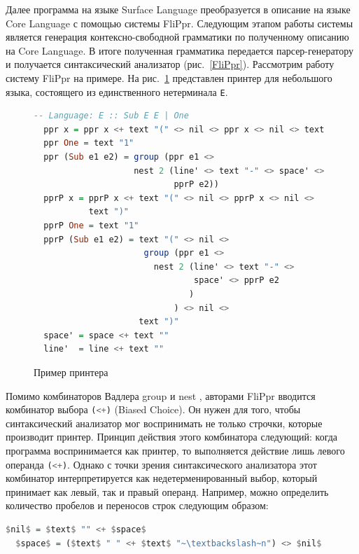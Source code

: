 Далее программа на языке Surface Language преобразуется в описание на языке Core Language 
с помощью системы FliPpr. Следующим этапом работы системы является генерация контексно-свободной 
грамматики по полученному описанию на Core Language. В итоге полученная грамматика передается 
парсер-генератору и получается синтаксический анализатор (рис.~\ref{FliPpr}).
Рассмотрим работу систему FliPpr на примере. На рис.~\ref{printer_example} представлен принтер 
для небольшого языка, состоящего из единственного нетерминала
\texttt{E}.
\begin{figure}[h]
\centering
\begin{lstlisting}[language=Haskell]
  -- Language: E :: Sub E E | One
  ppr x = ppr x <+ text "(" <> nil <> ppr x <> nil <> text ")"
  ppr One = text "1"
  ppr (Sub e1 e2) = group (ppr e1 <> 
                    nest 2 (line' <> text "-" <> space' <> 
                            pprP e2))
  pprP x = pprP x <+ text "(" <> nil <> pprP x <> nil <> 
           text ")"
  pprP One = text "1"
  pprP (Sub e1 e2) = text "(" <> nil <> 
                      group (ppr e1 <> 
                        nest 2 (line' <> text "-" <> 
                                space' <> pprP e2
                               )
                            ) <> nil <> 
                     text ")"
  space' = space <+ text ""
  line'  = line <+ text "" 
\end{lstlisting}
\caption{Пример принтера}
\label{printer_example}
\end{figure}

Помимо комбинаторов Вадлера
group и nest \cite{WadlerPrinter}, авторами FliPpr
вводится комбинатор выбора 
\lstinline[language=Haskell]{(<+)} (Biased Choice). Он нужен для того, чтобы синтаксический 
анализатор мог воспринимать не только строчки, которые производит принтер. Принцип действия 
этого комбинатора следующий: когда программа воспринимается как принтер, то выполняется 
действие лишь левого операнда \lstinline[language=Haskell]{(<+)}. Однако с точки зрения 
синтаксического анализатора этот комбинатор интерпретируется как недетерменированный выбор, 
который принимает как левый, так и правый операнд. Например, можно определить количество 
пробелов и переносов строк следующим образом:

\begin{lstlisting}[language=Haskell,mathescape]
  $nil$ = $text$ "" <+ $space$
  $space$ = ($text$ " " <+ $text$ "~\textbackslash~n") <> $nil$
\end{lstlisting}

